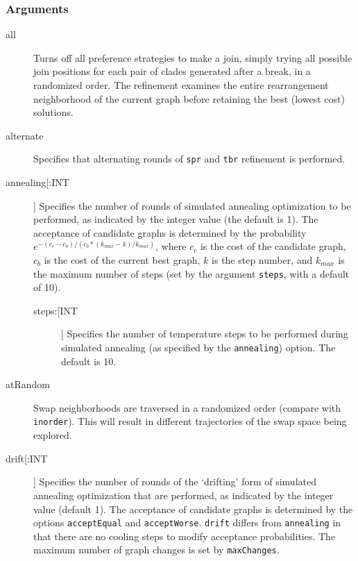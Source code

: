 	\subsubsection{Arguments}
	\begin{description}
		\item[all] Turns off all preference strategies to make a join, simply trying all possible 
		join positions for each pair of clades generated after a break, in a randomized order. 
		The refinement examines the entire rearrangement neighborhood of the current graph 
		before retaining the best (lowest cost) solutions.
		
		\item[alternate] Specifies that alternating rounds of \texttt{spr} \citep{Dayhoff1969} 
		and \texttt{tbr} \citep{Farris1988, swofford1990a} refinement is performed.
		
		\item[annealing[:INT]] Specifies the number of rounds of simulated annealing 
		\citep{Metropolisetal1953,Kirkpatricketal1983,Cerny1985} optimization to be performed, 
		as indicated by the integer value (the default is 1). The acceptance of candidate graphs 
		is determined by the probability $e ^ {- (c_c - c_b)/ (c_b * (k_{max} -k)/ k_{max})}$, 
		where $c_c$ is the cost of the candidate graph, $c_b$ is the cost of the current best 
		graph, $k$ is the step number, and $k_{max}$ is the maximum number of steps (set 
		by the argument \texttt{steps}, with a default of 10).
		
			\begin{description}
			\item[steps:[INT]] Specifies the number of temperature steps to be performed during 
			simulated annealing (as specified by the \texttt{annealing}) option. The default is 10.
			\end{description}
		
		\item[atRandom] Swap neighborhoods are traversed in a randomized order (compare 
		with \texttt{inorder}). 	This will result in different trajectories of the swap space being 
		explored.
		
		\item[drift[:INT]] Specifies the number of rounds of the `drifting' form of simulated 
		annealing \citep{goloboff1999} optimization that are performed, as indicated by the integer 
		value (default 1). The acceptance of candidate graphs is determined by the options 
		\texttt{acceptEqual} and \texttt{acceptWorse}. \texttt{drift} differs from \texttt{annealing} 
		in that there are no cooling steps to modify acceptance probabilities. The maximum 
		number of graph changes is set by \texttt{maxChanges}.
			

\end{description}
